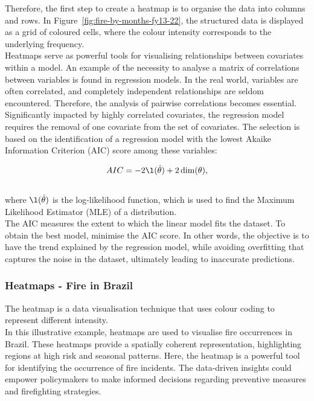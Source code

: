 \documentclass{article}\usepackage[]{graphicx}\usepackage[]{xcolor}
\begin{document}
\noindent
Therefore, the first step to create a heatmap is to organise the data into columns and rows. In Figure~\ref{fig:fire-by-months-fy13-22}, the structured data is displayed as a grid of coloured cells, where the colour intensity corresponds to the underlying frequency.\\

\noindent
Heatmaps serve as powerful tools for visualising relationships between covariates within a model. An example of the necessity to analyse a matrix of correlations between variables is found in regression models. In the real world, variables are often correlated, and completely independent relationships are seldom encountered. Therefore, the analysis of pairwise correlations becomes essential. Significantly impacted by highly correlated covariates, the regression model requires the removal of one covariate from the set of covariates. The selection is based on the identification of a regression model with the lowest Akaike Information Criterion (AIC) score among these variables: 

$$AIC = -2 \l(\hat{\mathbf{\theta}})+2 \dim (\mathbf{\theta}),$$
\\where $\l(\hat{\mathbf{\theta}})$ is the log-likelihood function, which is used to find the Maximum Likelihood Estimator (MLE) of a distribution.\\

\noindent
The AIC measures the extent to which the linear model fits the dataset. To obtain the best model, minimise the AIC score. In other words, the objective is to have the trend explained by the regression model, while avoiding overfitting that captures the noise in the dataset, ultimately leading to inaccurate predictions.

\subsubsection{Heatmaps - Fire in Brazil}

The heatmap is a data visualisation technique that uses colour coding to represent different intensity.\\

\noindent
In this illustrative example, heatmaps are used to visualise fire occurrences in Brazil. These heatmaps provide a spatially coherent representation, highlighting regions at high risk and seasonal patterns. Here, the heatmap is a powerful tool for identifying the occurrence of fire incidents. The data-driven insights could empower policymakers to make informed decisions regarding preventive measures and firefighting strategies.\\
\end{document}
